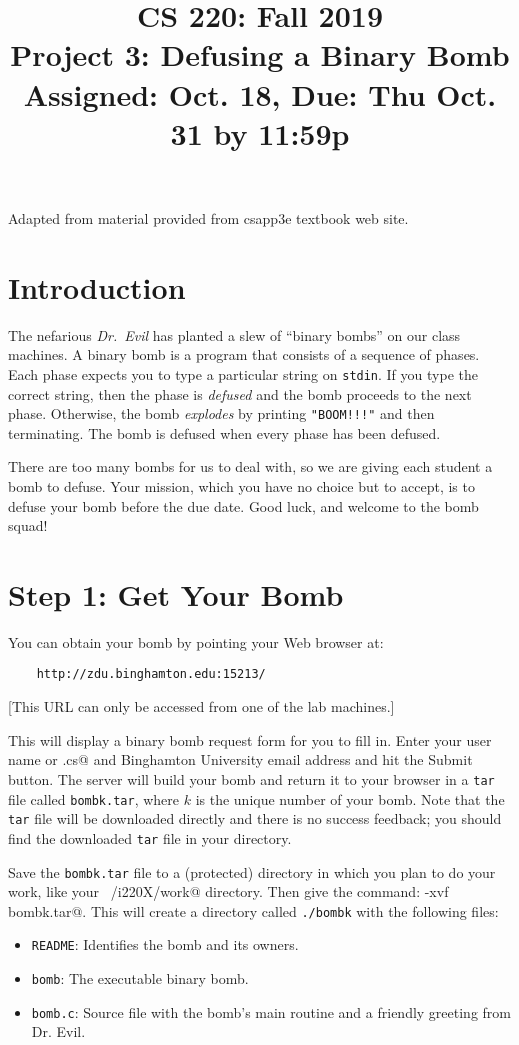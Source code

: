 \documentclass[11pt]{article}
\title{CS 220: Fall 2019\\
Project 3: Defusing a Binary Bomb\\
Assigned: Oct. 18, Due: Thu Oct. 31 by 11:59p\\
}
\author{}
\date{}
\begin{document}
\maketitle

Adapted from material provided from csapp3e textbook web site.

\section{Introduction}

The nefarious {\em Dr.~Evil} has planted a slew of ``binary bombs'' on
our class machines.  A binary bomb is a program that consists of a
sequence of phases. Each phase expects you to type a particular string
on \texttt{stdin}.  If you type the correct string, then the phase is
{\em defused} and the bomb proceeds to the next phase. Otherwise, the
bomb {\em explodes} by printing \verb."BOOM!!!". and then
terminating. The bomb is defused when every phase has been defused.

There are too many bombs for us to deal with, so we are giving each
student a bomb to defuse.  Your mission, which you have no choice but to
accept, is to defuse your bomb before the due date.  Good luck, and
welcome to the bomb squad!

\section*{Step 1: Get Your Bomb}

You can obtain your bomb by pointing your Web browser at:

\begin{verbatim}
    http://zdu.binghamton.edu:15213/
\end{verbatim}

[This URL can only be accessed from one of the lab machines.]

This will display a binary bomb request form for you to fill in.
Enter your user name or \verb@remote.cs@ and Binghamton University
email address and hit the Submit button.  The server will build your
bomb and return it to your browser in a \texttt{tar} file called
\texttt{bombk.tar}, where $k$ is the unique number of your bomb.  Note
that the \texttt{tar} file will be downloaded directly and there is no
success feedback; you should find the downloaded \texttt{tar} file in
your \verb@Downloads@ directory.

Save the \texttt{bombk.tar} file to a (protected) directory in which
you plan to do your work, like your \verb@~/i220X/work@ directory.
Then give the command: \verb@tar -xvf bombk.tar@.  This will create a
directory called \texttt{./bombk} with the following files:
\begin{itemize}
\item \texttt{README}: Identifies the bomb and its owners.
\item \texttt{bomb}: The executable binary bomb.
\item \texttt{bomb.c}: Source file with the bomb's main routine and a friendly greeting from Dr. Evil.
\end{itemize}
\end{document}
